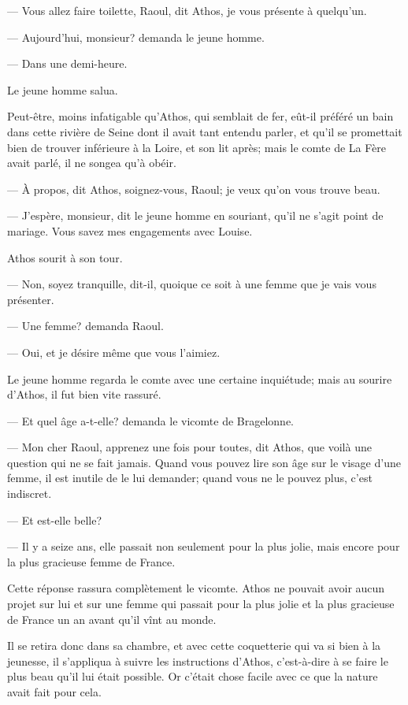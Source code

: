 — Vous allez faire toilette, Raoul, dit Athos, je vous présente à quelqu'un.

— Aujourd'hui, monsieur? demanda le jeune homme.

— Dans une demi-heure.

Le jeune homme salua.

Peut-être, moins infatigable qu'Athos, qui semblait de fer, eût-il préféré un bain dans cette rivière de Seine dont il avait tant entendu parler, et qu'il se promettait bien de trouver inférieure à la Loire, et son lit après; mais le comte de La Fère avait parlé, il ne songea qu'à obéir.

— À propos, dit Athos, soignez-vous, Raoul; je veux qu'on vous trouve beau.

— J'espère, monsieur, dit le jeune homme en souriant, qu'il ne s'agit point de mariage. Vous savez mes engagements avec Louise.

Athos sourit à son tour.

— Non, soyez tranquille, dit-il, quoique ce soit à une femme que je vais vous présenter.

— Une femme? demanda Raoul.

— Oui, et je désire même que vous l'aimiez.

Le jeune homme regarda le comte avec une certaine inquiétude; mais au sourire d'Athos, il fut bien vite rassuré.

— Et quel âge a-t-elle? demanda le vicomte de Bragelonne.

— Mon cher Raoul, apprenez une fois pour toutes, dit Athos, que voilà une question qui ne se fait jamais. Quand vous pouvez lire son âge sur le visage d'une femme, il est inutile de le lui demander; quand vous ne le pouvez plus, c'est indiscret.

— Et est-elle belle?

— Il y a seize ans, elle passait non seulement pour la plus jolie, mais encore pour la plus gracieuse femme de France.

Cette réponse rassura complètement le vicomte. Athos ne pouvait avoir aucun projet sur lui et sur une femme qui passait pour la plus jolie et la plus gracieuse de France un an avant qu'il vînt au monde.

Il se retira donc dans sa chambre, et avec cette coquetterie qui va si bien à la jeunesse, il s'appliqua à suivre les instructions d'Athos, c'est-à-dire à se faire le plus beau qu'il lui était possible. Or c'était chose facile avec ce que la nature avait fait pour cela.

